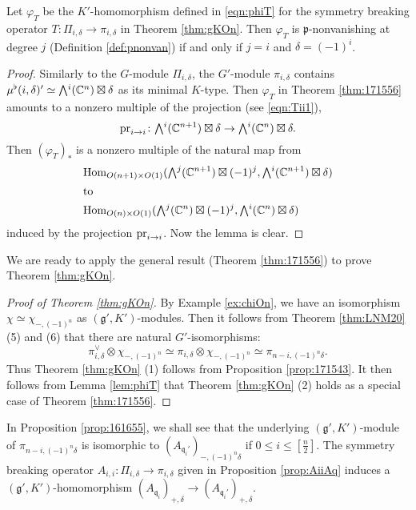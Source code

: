\begin{lemma}
\label{lem:phiT}
Let $\varphi_T$ be the $K'$-homomorphism
 defined in \eqref{eqn:phiT}
 for the symmetry breaking operator
 $T \colon \Pi_{i,\delta} \to \pi_{i,\delta}$
 in Theorem \ref{thm:gKOn}.  
Then $\varphi_T$ is ${\mathfrak{p}}$-nonvanishing
 at degree $j$ (Definition \ref{def:pnonvan})
 if and only if $j=i$ and $\delta=(-1)^i$.  
\end{lemma}
\begin{proof}
Similarly to the $G$-module $\Pi_{i,\delta}$, 
  the $G'$-module
$\pi_{i,\delta}$ contains 
$
   \mub(i,\delta)' \simeq \Exterior^i ({\mathbb{C}}^n) \boxtimes \delta
$
 as its minimal $K$-type.  
Then $\varphi_T$ in Theorem \ref{thm:171556} 
 amounts to a nonzero multiple
 of the projection 
 (see \eqref{eqn:Tii1}), 
\[
  \pr ii \colon 
  \Exterior^i({\mathbb{C}}^{n+1}) \boxtimes \delta 
  \to 
  \Exterior^i({\mathbb{C}}^{n}) \boxtimes \delta.  
\]
Then $(\varphi_T)_{\ast}$ is a nonzero multiple
 of the natural map from 
\begin{align*}
& {\operatorname{Hom}}_{O(n+1) \times O(1)}
  (\Exterior^j({\mathbb{C}}^{n+1})\boxtimes (-1)^j, \Exterior^i({\mathbb{C}}^{n+1})\boxtimes \delta)
\\
\intertext{to}
& {\operatorname{Hom}}_{O(n) \times O(1)}
  (\Exterior^j({\mathbb{C}}^{n})\boxtimes (-1)^j, \Exterior^i({\mathbb{C}}^{n})\boxtimes \delta)
\end{align*}
induced by the projection $\operatorname{pr}_{{i}\to{i}}$.  
Now the lemma is clear.  
\end{proof}
We are ready to apply the general result (Theorem \ref{thm:171556})
 to prove Theorem \ref{thm:gKOn}.  

\begin{proof}
[Proof of Theorem \ref{thm:gKOn}]
By Example \ref{ex:chiOn}, 
 we have an isomorphism
 $\chi \simeq \chi_{-, (-1)^n}$ as $({\mathfrak{g}}',K')$-modules.  
Then it follows from Theorem \ref{thm:LNM20} (5) and (6) 
 that there are natural $G'$-isomorphisms:
\[
  \pi_{i,\delta}^{\vee} \otimes \chi_{-,(-1)^n}
  \simeq
  \pi_{i,\delta} \otimes \chi_{-,(-1)^n} \simeq \pi_{n-i,(-1)^n \delta}.  
\]
Thus Theorem \ref{thm:gKOn} (1) follows from Proposition \ref{prop:171543}.  
It then follows from Lemma \ref{lem:phiT}
 that Theorem \ref{thm:gKOn} (2) holds
 as a special case of Theorem \ref{thm:171556}.  
\end{proof}



In Proposition \ref{prop:161655}, 
 we shall see that the underlying $({\mathfrak{g}}',K')$-module 
 of $\pi_{n-i, (-1)^n\delta}$ is isomorphic to 
 $(A_{{\mathfrak{q}}_i'})_{-,(-1)^n\delta}$
 if $0 \le i \le [\frac n 2]$. 
The symmetry breaking operator 
$
   A_{i,i} \colon \Pi_{i,\delta} \to \pi_{i,\delta}$
 given in Proposition \ref{prop:AiiAq}
 induces a $(\mathfrak{g}', K')$-homomorphism $(A_{{\mathfrak{q}}_i})_{+,\delta} \to (A_{{\mathfrak{q}}_i'})_{+,\delta}$.

